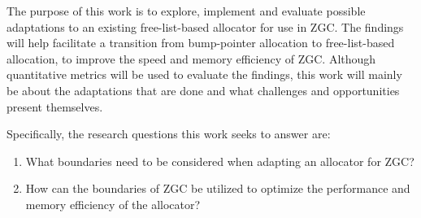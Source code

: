 
The purpose of this work is to explore, implement and evaluate possible adaptations to an existing free-list-based allocator for use in ZGC. The findings will help facilitate a transition from bump-pointer allocation to free-list-based allocation, to improve the speed and memory efficiency of ZGC. Although quantitative metrics will be used to evaluate the findings, this work will mainly be about the adaptations that are done and what challenges and opportunities present themselves.

Specifically, the research questions this work seeks to answer are:

\begin{enumerate}
    \item What boundaries need to be considered when adapting an allocator for ZGC?
    \item How can the boundaries of ZGC be utilized to optimize the performance and memory efficiency of the allocator?
\end{enumerate}

